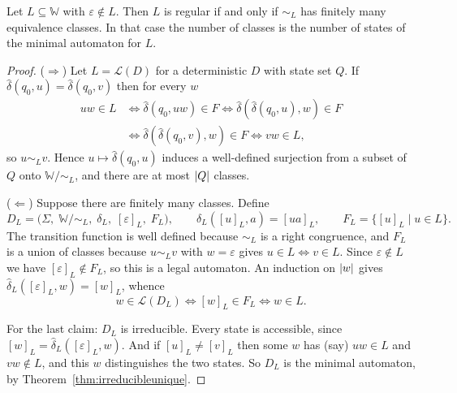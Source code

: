 \documentclass[a4paper]{scrartcl}
\newcommand{\WW}{\mathbb{W}}
\newcommand{\lang}{\mathcal{L}}
\newcommand{\eps}{\varepsilon}
\newcommand{\initarr}[2]{\draw[tra] ($(#1)+#2$) -- (#1);}
\begin{document}
\begin{center}
\end{center}

\begin{theorem}\label{thm:myhillnerode}
	Let $L \subseteq \WW$ with $\eps \notin L$. Then $L$ is regular if and only if $\sim_L$ has finitely many equivalence classes. In that case the number of classes is the number of states of the minimal automaton for $L$.
\end{theorem}

\begin{proof}
	($\Rightarrow$) Let $L = \lang(D)$ for a deterministic $D$ with state set $Q$. If $\hat\delta(q_0,u) = \hat\delta(q_0,v)$ then for every $w$
	\begin{align*}
		uw \in L &\iff \hat\delta(q_0,uw) \in F \iff \hat\delta(\hat\delta(q_0,u),w) \in F \\
		&\iff \hat\delta(\hat\delta(q_0,v),w) \in F \iff vw \in L,
	\end{align*}
	so $u \sim_L v$. Hence $u \mapsto \hat\delta(q_0,u)$ induces a well-defined surjection from a subset of $Q$ onto $\WW/{\sim_L}$, and there are at most $\lvert Q\rvert$ classes.

	($\Leftarrow$) Suppose there are finitely many classes. Define
	$$D_L = \big(\Sigma,\; \WW/{\sim_L},\; \delta_L,\; [\eps]_L,\; F_L\big), \qquad \delta_L([u]_L, a) = [ua]_L, \qquad F_L = \{[u]_L \mid u \in L\}.$$
	The transition function is well defined because $\sim_L$ is a right congruence, and $F_L$ is a union of classes because $u \sim_L v$ with $w = \eps$ gives $u \in L \iff v \in L$. Since $\eps \notin L$ we have $[\eps]_L \notin F_L$, so this is a legal automaton. An induction on $\lvert w\rvert$ gives $\hat\delta_L([\eps]_L, w) = [w]_L$, whence
	$$w \in \lang(D_L) \iff [w]_L \in F_L \iff w \in L.$$

	For the last claim: $D_L$ is irreducible. Every state is accessible, since $[w]_L = \hat\delta_L([\eps]_L,w)$. And if $[u]_L \neq [v]_L$ then some $w$ has (say) $uw \in L$ and $vw \notin L$, and this $w$ distinguishes the two states. So $D_L$ is the minimal automaton, by Theorem~\ref{thm:irreducibleunique}.
\end{proof}
\end{document}
